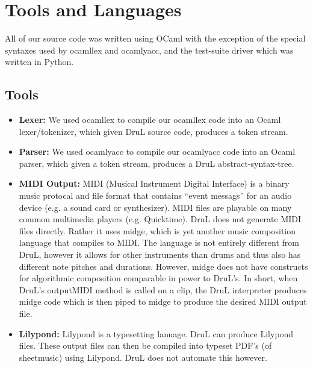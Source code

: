 \section{Tools and Languages}

All of our source code was written using OCaml with the exception of the special syntaxes used by ocamllex and ocamlyacc, and the test-suite driver which was written in Python.

\subsection{Tools}

\begin{itemize}
\item \textbf{Lexer:} We used ocamllex to compile our ocamllex code into an Ocaml lexer/tokenizer, which given DruL source code, produces a token stream.

\item \textbf{Parser:} We used ocamlyacc to compile our ocamlyacc code into an Ocaml parser, which given a token stream, produces a DruL abstract-syntax-tree.

\item \textbf{MIDI Output:} MIDI (Musical Instrument Digital Interface) is a binary music protocal and file format that contains ``event messags'' for an audio device (e.g. a sound card or synthesizer).  MIDI files are playable on many common multimedia players (e.g. Quicktime).  DruL does not generate MIDI files directly.  Rather it uses midge, which is yet another music composition language that compiles to MIDI.  The language is not entirely different from DruL, however it allows for other instruments than drums and thus also has different note pitches and durations.  However, midge does not have constructs for algorithmic composition comparable in power to DruL's.  In short, when DruL's outputMIDI method is called on a clip, the DruL interpreter produces midge code which is then piped to midge to produce the desired MIDI output file.

\item \textbf{Lilypond:} Lilypond is a typesetting lanuage.  DruL can produce Lilypond files.  These output files can then be compiled into typeset PDF's (of sheetmusic) using Lilypond.  DruL does not automate this however.

\end{itemize}

